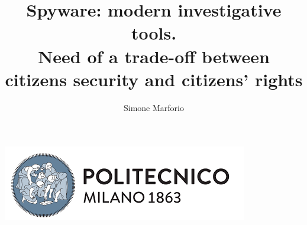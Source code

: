 \begin{titlepage}
        \title{Spyware: modern investigative tools.\\Need of a trade-off between citizens security and citizens' rights}
        \author{Simone Marforio}
		\maketitle
		\begin{center}
			\includegraphics[scale=0.5]{Images/PolimiLogo}
		\end{center}
\end{titlepage}